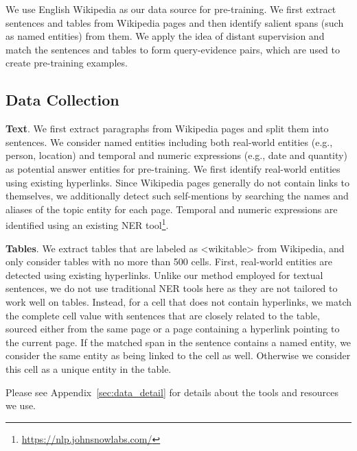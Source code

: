 \documentclass[11pt]{article}
\newcommand{\hs}[1]{\textcolor{blue}{Huan: #1}}
\newcommand{\revise}[1]{#1}
\newcommand{\nop}[1]{}
\begin{document}
\label{sec:DS}
We use English Wikipedia as our data source for pre-training. We first extract sentences and tables from Wikipedia pages and then identify salient spans {(such as named entities) from them}\nop{\hs{from the sentences? because you are saying `used as answers...'} that can be used as answers}. We apply the idea of distant supervision and match the sentences and tables to form query-evidence pairs, {which are used to create pre-training examples.}

\subsection{Data Collection}
\noindent\textbf{Text}. We first extract paragraphs from Wikipedia pages and split them into sentences. We consider named entities including both real-world entities (e.g., person, location) and temporal and numeric expressions (e.g., date and quantity) as potential answer entities for pre-training. We first identify real-world entities using existing hyperlinks. Since Wikipedia pages generally do not contain links to themselves, we additionally detect such self-mentions by searching the names and aliases of the topic entity for each page. \revise{Temporal and numeric expressions are identified using an existing NER tool\footnote{\url{https://nlp.johnsnowlabs.com/}}.}

\noindent\textbf{\revise{Tables}}. We extract tables that are labeled as <wikitable> from Wikipedia, and only consider tables with no more than 500 cells. First,  real-world entities are detected using existing hyperlinks. Unlike our method employed for textual sentences, we do not use traditional NER tools here as they are not tailored to work well on tables. Instead, for a cell that does not contain hyperlinks, we match the complete cell value with sentences that are closely related to the table, sourced either from the same page or a page containing a hyperlink pointing to the current page.\nop{I wonder if there is a more clear way to rephrase the following sentence. how to get the matched span in the sentence?} If the matched span in the sentence contains a named entity, we consider the same entity as being linked to the cell as well. Otherwise we consider this cell as a unique entity in the table.\nop{Concrete examples may be needed (can be put in Appendix) to explain this process well.}

Please see Appendix~\ref{sec:data_detail} for details about the tools and resources we use.

\nop{perhaps reordered the writing a bit here.  First say we use existing hyperlinks to aim for high-precision entity linking.  Next, say we don't use traditional NER tools as they are not tailored towards tables, therefore cannot provide the level of precision we're comfortable with.  Then describe what we're doing in addition to hyperlinks to increase table entity recall while keeping the high precision.}
\end{document}
